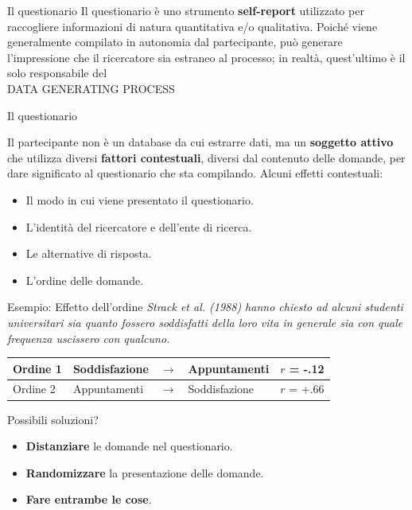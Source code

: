 \documentclass{beamer}
\begin{document}
\begin{frame}{Il questionario}
    Il questionario è uno strumento \textbf{self-report} utilizzato per raccogliere informazioni di natura quantitativa e/o qualitativa. Poiché viene generalmente compilato in autonomia dal partecipante, può generare l'impressione che il ricercatore sia estraneo al processo; in realtà, quest'ultimo è il solo responsabile del \\
    \vspace{1em}
    \pause
    \huge\centering
    \alert{DATA GENERATING PROCESS}
\end{frame}

\begin{frame}{Il questionario}
\begin{block}{Il partecipante}
    non è un database da cui estrarre dati, ma un \textbf{soggetto attivo} che utilizza diversi \textbf{fattori contestuali}, diversi dal contenuto delle domande, per dare significato al questionario che sta compilando. Alcuni effetti contestuali: \\
    \begin{itemize}
        \item Il modo in cui viene presentato il questionario.
        \item L’identità del ricercatore e dell’ente di ricerca.
        \item Le alternative di risposta.
        \item L'ordine delle domande.
    \end{itemize}
\end{block}
\end{frame}

\begin{frame}{Esempio: Effetto dell'ordine}
\textit{Strack et al. (1988)  hanno chiesto ad alcuni studenti universitari sia quanto fossero soddisfatti della loro vita in generale sia con quale frequenza uscissero con qualcuno.} \\
\vspace{1em}
\centering
\begin{tabular}{l|lclc}
    \toprule
   Ordine 1 & Soddisfazione & $\rightarrow$ & Appuntamenti & $r$ = -.12 \\
   \midrule
   \pause
   Ordine 2 & Appuntamenti & $\rightarrow$ & Soddisfazione & $r$ = +.66 \\
   \bottomrule
\end{tabular}
\vspace{0.3cm}
\begin{block}{Possibili soluzioni?}
\pause
\begin{itemize}
    \item \textbf{Distanziare} le domande nel questionario.
    \pause
    \item \textbf{Randomizzare} la presentazione delle domande.
    \pause
    \item \textbf{Fare entrambe le cose}.
\end{itemize}
\end{block}
\end{frame}
\end{document}
